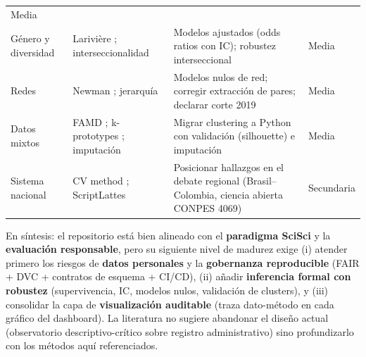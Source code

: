 \begin{longtable}{p{3.1cm}p{3.4cm}p{4.4cm}p{2.3cm}}
Media \\
Género y diversidad & Larivière \cite{lariviere2013global}; interseccionalidad \cite{crenshaw1989demarginalizing} &
Modelos ajustados (odds ratios con IC); robustez interseccional &
Media \\
Redes & Newman \cite{newman2001structure}; jerarquía \cite{clauset2015systematic} &
Modelos nulos de red; corregir extracción de pares; declarar corte 2019 &
Media \\
Datos mixtos & FAMD \cite{husson2017exploratory}; k-prototypes \cite{huang1998extensions}; imputación \cite{vanbuuren2018flexible} &
Migrar clustering a Python con validación (silhouette) e imputación &
Media \\
Sistema nacional & CV method \cite{canibano2009curriculum}; ScriptLattes \cite{menachalco2009scriptlattes} &
Posicionar hallazgos en el debate regional (Brasil--Colombia, ciencia abierta CONPES 4069) &
Secundaria \\
\bottomrule
\end{longtable}

\begin{tcolorbox}[hallazgo]
En síntesis: el repositorio está bien alineado con el \textbf{paradigma SciSci}
y la \textbf{evaluación responsable}, pero su siguiente nivel de madurez exige
(i) atender primero los riesgos de \textbf{datos personales} y la
\textbf{gobernanza reproducible} (FAIR + DVC + contratos de esquema + CI/CD),
(ii) añadir \textbf{inferencia formal con robustez} (supervivencia, IC, modelos
nulos, validación de clusters), y (iii) consolidar la capa de
\textbf{visualización auditable} (traza dato-método en cada gráfico del
dashboard). La literatura no sugiere abandonar el diseño actual (observatorio
descriptivo-crítico sobre registro administrativo) sino profundizarlo con los
métodos aquí referenciados.
\end{tcolorbox}
